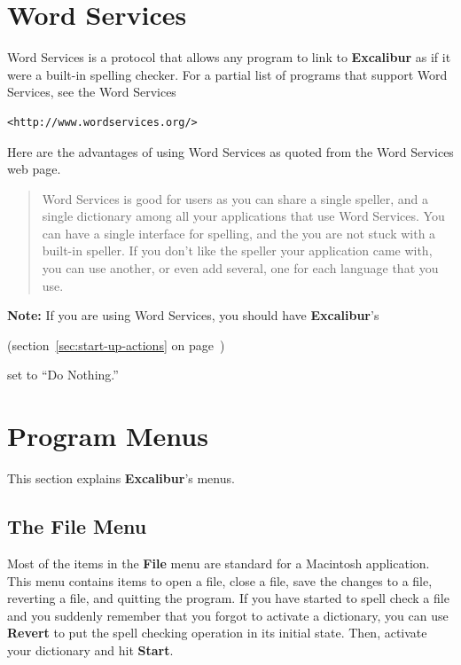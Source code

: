 ﻿\documentclass[11pt,titlepage]{article}
\newcommand{\ex}{\textbf{Excalibur}}
\begin{document}
\section{Word Services}
\label{sec:word-services}

Word Services is a protocol that allows any program to link to \ex{}
as if it were a built-in spelling checker.  For a partial list of
programs that support Word Services, see the Word Services
\begin{latexonly}
\begin{verbatim}
<http://www.wordservices.org/>
\end{verbatim}
\end{latexonly}

Here are the advantages of using Word Services as quoted from the Word
Services web page.

\begin{quote}
  Word Services is good for users as you can share a single speller,
  and a single dictionary among all your applications that use Word
  Services. You can have a single interface for spelling, and the you
  are not stuck with a built-in speller. If you don't like the speller
  your application came with, you can use another, or even add
  several, one for each language that you use.
\end{quote}

\textbf{Note:} If you are using Word Services, you should have \ex's
\begin{latexonly}
  (section~\ref{sec:start-up-actions} on
  page~\pageref{sec:start-up-actions})
\end{latexonly}
set to ``Do Nothing.''

\section{Program Menus}

This section explains \ex's menus.

\subsection{The File Menu}

Most of the items in the \textbf{File} menu are standard for a
Macintosh application. This menu contains items to open a file, close
a file, save the changes to a file, reverting a file, and quitting the
program.  If you have started to spell check a file and you suddenly
remember that you forgot to activate a dictionary, you can use
\textbf{Revert} to put the spell checking operation in its initial
state.  Then, activate your dictionary and hit \textbf{Start}.
\end{document}
